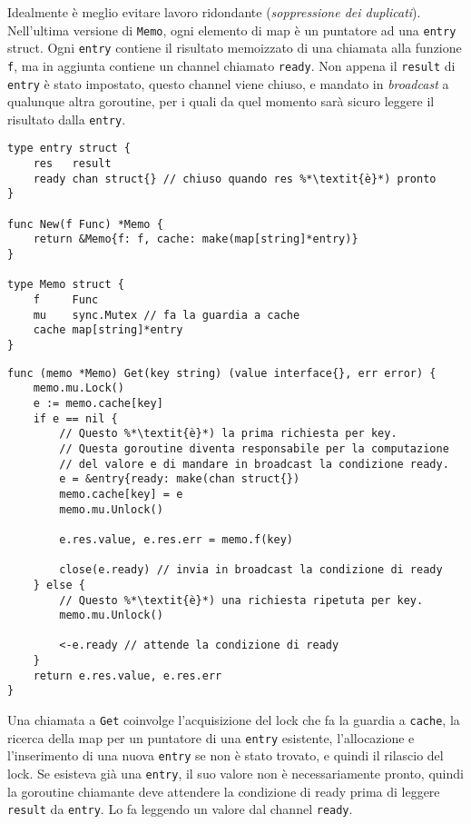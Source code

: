 \documentclass[../../thesis.tex]{subfiles}
\begin{document}
    Idealmente è meglio evitare lavoro ridondante (\textit{soppressione dei duplicati}).
    Nell'ultima versione di \verb"Memo", ogni elemento di map è un puntatore ad una \verb"entry" struct.
    Ogni \verb"entry" contiene il risultato memoizzato di una chiamata alla funzione \verb"f", ma in aggiunta contiene un channel chiamato \verb"ready".
    Non appena il \verb"result" di \verb"entry" è stato impostato, questo channel viene chiuso, e mandato in \textit{broadcast} a qualunque altra goroutine, per i quali da quel momento sarà sicuro leggere il risultato dalla \verb"entry".
    \begin{lstlisting}[frame = single, label = {lst:lstlisting9-7.8}]
type entry struct {
    res   result
    ready chan struct{} // chiuso quando res %*\textit{è}*) pronto
}

func New(f Func) *Memo {
    return &Memo{f: f, cache: make(map[string]*entry)}
}

type Memo struct {
    f     Func
    mu    sync.Mutex // fa la guardia a cache
    cache map[string]*entry
}
    \end{lstlisting}
    \clearpage
    \newpage
    \begin{lstlisting}[frame = single, label = {lst:lstlisting9-7.9}]
func (memo *Memo) Get(key string) (value interface{}, err error) {
    memo.mu.Lock()
    e := memo.cache[key]
    if e == nil {
        // Questo %*\textit{è}*) la prima richiesta per key.
        // Questa goroutine diventa responsabile per la computazione
        // del valore e di mandare in broadcast la condizione ready.
        e = &entry{ready: make(chan struct{})
        memo.cache[key] = e
        memo.mu.Unlock()
        
        e.res.value, e.res.err = memo.f(key)
        
        close(e.ready) // invia in broadcast la condizione di ready
    } else {
        // Questo %*\textit{è}*) una richiesta ripetuta per key.
        memo.mu.Unlock()
        
        <-e.ready // attende la condizione di ready
    }
    return e.res.value, e.res.err
}
    \end{lstlisting}
    Una chiamata a \verb"Get" coinvolge l'acquisizione del lock che fa la guardia a \verb"cache", la ricerca della map per un puntatore di una \verb"entry" esistente, l'allocazione e l'inserimento di una nuova \verb"entry" se non è stato trovato, e quindi il rilascio del lock.
    Se esisteva già una \verb"entry", il suo valore non è necessariamente pronto, quindi la goroutine chiamante deve attendere la condizione di ready prima di leggere \verb"result" da \verb"entry".
    Lo fa leggendo un valore dal channel \verb"ready".
    \hfill \vspace{12pt}
\end{document}
